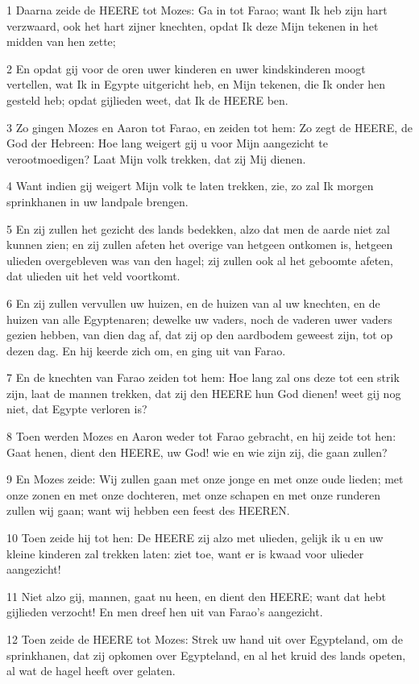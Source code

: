 \par 1 Daarna zeide de HEERE tot Mozes: Ga in tot Farao; want Ik heb zijn hart verzwaard, ook het hart zijner knechten, opdat Ik deze Mijn tekenen in het midden van hen zette;
\par 2 En opdat gij voor de oren uwer kinderen en uwer kindskinderen moogt vertellen, wat Ik in Egypte uitgericht heb, en Mijn tekenen, die Ik onder hen gesteld heb; opdat gijlieden weet, dat Ik de HEERE ben.
\par 3 Zo gingen Mozes en Aaron tot Farao, en zeiden tot hem: Zo zegt de HEERE, de God der Hebreen: Hoe lang weigert gij u voor Mijn aangezicht te verootmoedigen? Laat Mijn volk trekken, dat zij Mij dienen.
\par 4 Want indien gij weigert Mijn volk te laten trekken, zie, zo zal Ik morgen sprinkhanen in uw landpale brengen.
\par 5 En zij zullen het gezicht des lands bedekken, alzo dat men de aarde niet zal kunnen zien; en zij zullen afeten het overige van hetgeen ontkomen is, hetgeen ulieden overgebleven was van den hagel; zij zullen ook al het geboomte afeten, dat ulieden uit het veld voortkomt.
\par 6 En zij zullen vervullen uw huizen, en de huizen van al uw knechten, en de huizen van alle Egyptenaren; dewelke uw vaders, noch de vaderen uwer vaders gezien hebben, van dien dag af, dat zij op den aardbodem geweest zijn, tot op dezen dag. En hij keerde zich om, en ging uit van Farao.
\par 7 En de knechten van Farao zeiden tot hem: Hoe lang zal ons deze tot een strik zijn, laat de mannen trekken, dat zij den HEERE hun God dienen! weet gij nog niet, dat Egypte verloren is?
\par 8 Toen werden Mozes en Aaron weder tot Farao gebracht, en hij zeide tot hen: Gaat henen, dient den HEERE, uw God! wie en wie zijn zij, die gaan zullen?
\par 9 En Mozes zeide: Wij zullen gaan met onze jonge en met onze oude lieden; met onze zonen en met onze dochteren, met onze schapen en met onze runderen zullen wij gaan; want wij hebben een feest des HEEREN.
\par 10 Toen zeide hij tot hen: De HEERE zij alzo met ulieden, gelijk ik u en uw kleine kinderen zal trekken laten: ziet toe, want er is kwaad voor ulieder aangezicht!
\par 11 Niet alzo gij, mannen, gaat nu heen, en dient den HEERE; want dat hebt gijlieden verzocht! En men dreef hen uit van Farao's aangezicht.
\par 12 Toen zeide de HEERE tot Mozes: Strek uw hand uit over Egypteland, om de sprinkhanen, dat zij opkomen over Egypteland, en al het kruid des lands opeten, al wat de hagel heeft over gelaten.
